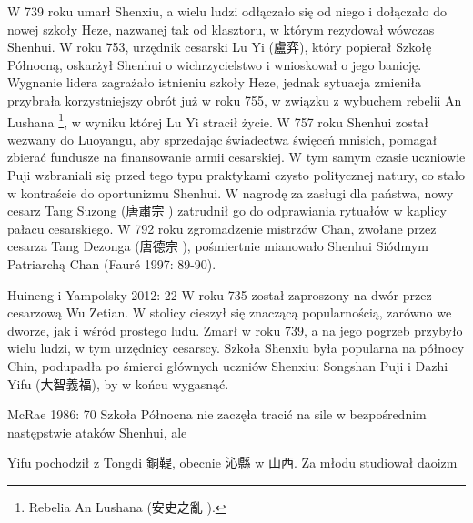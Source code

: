 W 739 roku umarł Shenxiu, a wielu ludzi odłączało się od niego i dołączało do nowej szkoły Heze, nazwanej tak od klasztoru, w którym rezydował wówczas Shenhui.
W roku 753, urzędnik cesarski Lu Yi (盧弈), który popierał Szkołę Północną, oskarżył Shenhui o wichrzycielstwo i wnioskował o jego banicję.
Wygnanie lidera zagrażało istnieniu szkoły Heze, jednak sytuacja zmieniła przybrała korzystniejszy obrót już w roku 755, w związku z wybuchem rebelii An Lushana%
\footnote{Rebelia An Lushana (安史之亂 ).}, w wyniku której Lu Yi stracił życie.
W 757 roku Shenhui został wezwany do Luoyangu, aby sprzedając świadectwa święceń mnisich, pomagał zbierać fundusze na finansowanie armii cesarskiej.
W tym samym czasie uczniowie Puji wzbraniali się przed tego typu praktykami czysto politycznej natury, co stało w kontraście do oportunizmu Shenhui.
W nagrodę za zasługi dla państwa, nowy cesarz Tang Suzong	(唐肅宗 ) zatrudnił go do odprawiania rytuałów w kaplicy pałacu cesarskiego.
W 792 roku zgromadzenie mistrzów Chan, zwołane przez cesarza Tang Dezonga (唐德宗 ), pośmiertnie mianowało Shenhui Siódmym Patriarchą Chan
(Fauré 1997: 89-90).

Huineng i Yampolsky 2012: 22
W roku 735 został zaproszony na dwór przez cesarzową Wu Zetian. W stolicy cieszył się znaczącą popularnością, zarówno we dworze, jak i wśród prostego ludu.
Zmarł w roku 739, a na jego pogrzeb przybyło wielu ludzi, w tym urzędnicy cesarscy.
Szkoła Shenxiu była popularna na północy Chin, podupadła po śmierci głównych uczniów Shenxiu: Songshan Puji i Dazhi Yifu (大智義福), by w końcu wygasnąć. %

McRae 1986: 70
Szkoła Północna nie zaczęła tracić na sile w bezpośrednim następstwie ataków Shenhui, ale

Yifu pochodził z Tongdi 銅鞮, obecnie 沁縣 w 山西.
Za młodu studiował daoizm
\fi

